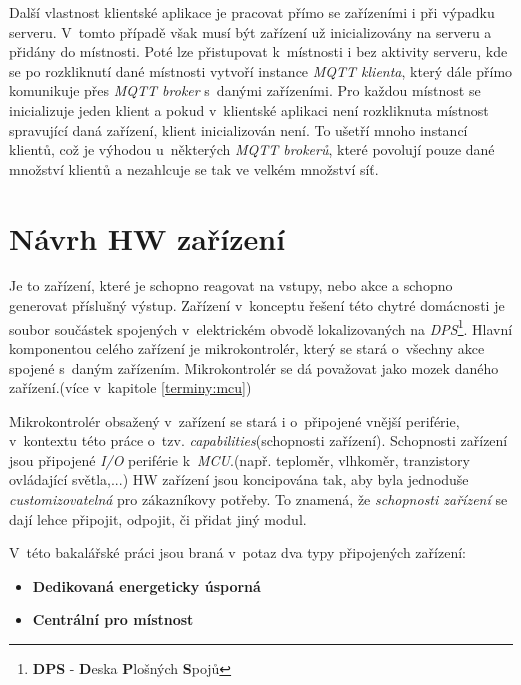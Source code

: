 Další vlastnost klientské aplikace je pracovat přímo se zařízeními i při výpadku serveru.
V~tomto případě však musí být zařízení už inicializovány na serveru a přidány do místnosti.
Poté lze přistupovat k~místnosti i bez aktivity serveru, kde se po rozkliknutí dané místnosti vytvoří instance \emph{MQTT klienta}, který dále přímo komunikuje přes \emph{MQTT broker} s~danými zařízeními.
Pro každou místnost se inicializuje jeden klient a pokud v~klientské aplikaci není rozkliknuta místnost spravující daná zařízení, klient inicializován není.
To ušetří mnoho instancí klientů, což je výhodou u~některých \emph{MQTT brokerů}, které povolují pouze dané množství klientů a nezahlcuje se tak ve velkém množství síť.

\section{Návrh HW zařízení}
\label{navrh:hardware}

Je to zařízení, které je schopno reagovat na vstupy, nebo akce a schopno generovat příslušný výstup.
Zařízení v~konceptu řešení této chytré domácnosti je soubor součástek spojených v~elektrickém obvodě lokalizovaných na \emph{DPS}\footnote{\textbf{DPS} - \textbf{D}eska \textbf{P}lošných \textbf{S}pojů}.
Hlavní komponentou celého zařízení je mikrokontrolér, který se stará o~všechny akce spojené s~daným zařízením.
Mikrokontrolér se dá považovat jako mozek daného zařízení.(více v~kapitole \ref{terminy:mcu})

Mikrokontrolér obsažený v~zařízení se stará i o~připojené vnější periférie, v~kontextu této práce o~tzv. \emph{capabilities}(schopnosti zařízení).
Schopnosti zařízení jsou připojené \emph{I/O} periférie k~\emph{MCU}.(např. teploměr, vlhkoměr, tranzistory ovládající světla,...)
HW zařízení jsou koncipována tak, aby byla jednoduše \emph{customizovatelná} pro zákazníkovy potřeby.
To znamená, že \emph{schopnosti zařízení} se dají lehce připojit, odpojit, či přidat jiný modul.
\newline

V~této bakalářské práci jsou braná v~potaz dva typy připojených zařízení:
\begin{itemize}
  \item \textbf{Dedikovaná energeticky úsporná}
  \item \textbf{Centrální pro místnost}
\end{itemize}

